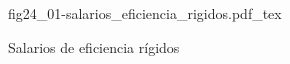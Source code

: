 \begin{figure}[h]
\centering
\def\svgwidth{0.5\textwidth}
{fig24_01-salarios_eficiencia_rigidos.pdf_tex}
\caption{Salarios de eficiencia rígidos}
\label{fig24_01-salarios_eficiencia_rigidos}
\end{figure}